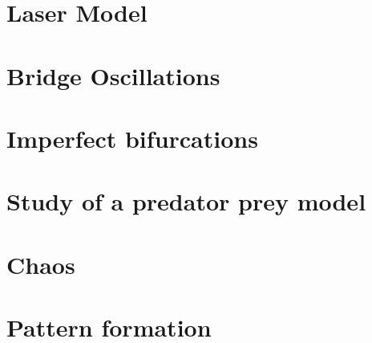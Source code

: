 




 
\tableofcontents
\setcounter{page}{0}

\chapter{Laser Model}


\chapter{Bridge Oscillations}


\chapter{Imperfect bifurcations}


\chapter{Study of a predator prey model}


\chapter{Chaos}


\chapter{Pattern formation}



